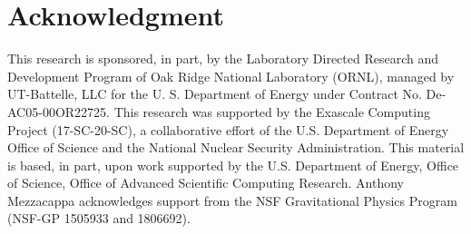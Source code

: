 \section{Acknowledgment} \label{se:Acknowledgment}

This research is sponsored, in part, by the Laboratory Directed Research and Development Program of Oak Ridge National Laboratory (ORNL), managed by UT-Battelle, LLC for the U. S. Department of Energy under Contract No. De-AC05-00OR22725.  
This research was supported by the Exascale Computing Project (17-SC-20-SC), a collaborative effort of the U.S. Department of Energy Office of Science and the National Nuclear Security Administration.  
This material is based, in part, upon work supported by the U.S. Department of Energy, Office of Science, Office of Advanced Scientific Computing Research.
Anthony Mezzacappa acknowledges support from the NSF Gravitational Physics Program (NSF-GP 1505933 and 1806692).  